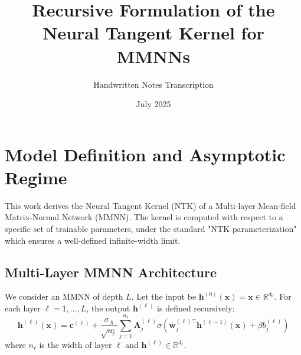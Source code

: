 \documentclass[12pt]{article}
\title{Recursive Formulation of the Neural Tangent Kernel for MMNNs}
\author{Handwritten Notes Transcription}
\date{July 2025}
\begin{document}
\maketitle

\section{Model Definition and Asymptotic Regime}
This work derives the Neural Tangent Kernel (NTK) of a Multi-layer Mean-field Matrix-Normal Network (MMNN). The kernel is computed with respect to a specific set of trainable parameters, under the standard "NTK parameterization" which ensures a well-defined infinite-width limit.

\subsection{Multi-Layer MMNN Architecture}
We consider an MMNN of depth $L$. Let the input be $\bm{h}^{(0)}(\bm{x}) = \bm{x} \in \mathbb{R}^{d_0}$. For each layer $\ell = 1, \dots, L$, the output $\bm{h}^{(\ell)}$ is defined recursively:
\begin{equation}
    \bm{h}^{(\ell)}(\bm{x}) = \bm{c}^{(\ell)} + \frac{\sigma_A}{\sqrt{n_\ell}} \sum_{j=1}^{n_\ell} \bm{A}_j^{(\ell)} \sigma\left(\bm{w}_j^{(\ell)\top} \bm{h}^{(\ell-1)}(\bm{x}) + \beta b_j^{(\ell)}\right)
\end{equation}
where $n_\ell$ is the width of layer $\ell$ and $\bm{h}^{(\ell)} \in \mathbb{R}^{d_\ell}$.
\end{document}
